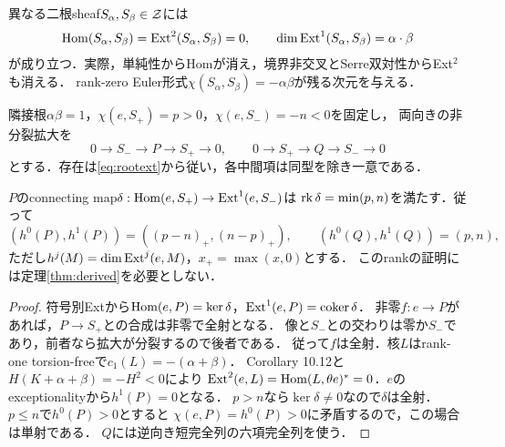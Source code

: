 異なる二根sheaf$S_\alpha,S_\beta\in\mathcal Z$には
\begin{equation}\label{eq:rootext}
\operatorname{Hom}(S_\alpha,S_\beta)=\operatorname{Ext}^2(S_\alpha,S_\beta)=0,
\qquad \dim\operatorname{Ext}^1(S_\alpha,S_\beta)=\alpha\cdot\beta
\end{equation}
が成り立つ．実際，単純性からHomが消え，境界非交叉とSerre双対性からExt$^2$も消える．
rank-zero Euler形式$\chi(S_\alpha,S_\beta)=-\alpha\beta$が残る次元を与える．

隣接根$\alpha\beta=1$，$\chi(e,S_+)=p>0$，$\chi(e,S_-)=-n<0$を固定し，
両向きの非分裂拡大を
\begin{equation}\label{eq:PQ}
0\to S_-\to P\to S_+\to0,
\qquad 0\to S_+\to Q\to S_-\to0
\end{equation}
とする．存在は\eqref{eq:rootext}から従い，各中間項は同型を除き一意である．

\begin{proposition}\label{prop:rank}
$P$のconnecting map$\delta:\operatorname{Hom}(e,S_+)\to\operatorname{Ext}^1(e,S_-)$は
$\operatorname{rk}\delta=\min(p,n)$を満たす．従って
\[
(h^0(P),h^1(P))=((p-n)_+,(n-p)_+),\qquad (h^0(Q),h^1(Q))=(p,n),
\]
ただし$h^j(M)=\dim\operatorname{Ext}^j(e,M)$，$x_+=\max(x,0)$とする．
このrankの証明には定理\ref{thm:derived}を必要としない．
\end{proposition}
\begin{proof}
符号別Extから$\operatorname{Hom}(e,P)=\ker\delta$，$\operatorname{Ext}^1(e,P)=\operatorname{coker}\delta$．
非零$f:e\to P$があれば，$P\to S_+$との合成は非零で全射となる．
像と$S_-$との交わりは零か$S_-$であり，前者なら拡大が分裂するので後者である．
従って$f$は全射．核$L$はrank-one torsion-freeで$c_1(L)=-(\alpha+\beta)$．
Corollary 10.12と$H(K+\alpha+\beta)=-H^2<0$により
$\operatorname{Ext}^2(e,L)=\operatorname{Hom}(L,\theta e)^*=0$．$e$のexceptionalityから$h^1(P)=0$となる．
$p>n$なら$\ker\delta\ne0$なので$\delta$は全射．$p\le n$で$h^0(P)>0$とすると
$\chi(e,P)=h^0(P)>0$に矛盾するので，この場合は単射である．
$Q$には逆向き短完全列の六項完全列を使う．
\end{proof}

